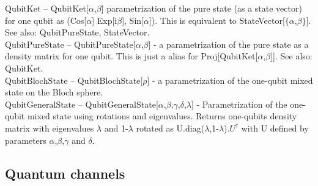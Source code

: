 \noindent\textbf{$ \text{QubitKet} $ }-- QubitKet[$\alpha $,$\beta $] parametrization of the pure state (as a state vector) for one qubit as (Cos[$\alpha $] Exp[i$\beta $], Sin[$\alpha $]). This is equivalent to StateVector[$\{\alpha $,$\beta \}$]. See also: QubitPureState, StateVector.$  $\\
\noindent\textbf{$ \text{QubitPureState} $ }-- QubitPureState[$\alpha $,$\beta $] - a parametrization of the pure state as a density matrix for one qubit. This is just a alias for Proj[QubitKet[$\alpha $,$\beta $]]. See also: QubitKet.$  $\\
\noindent\textbf{$ \text{QubitBlochState} $ }-- QubitBlochState[$\rho $] - a parametrization of the one-qubit mixed state on the Bloch sphere.$  $\\
\noindent\textbf{$ \text{QubitGeneralState} $ }-- QubitGeneralState[$\alpha $,$\beta $,$\gamma $,$\delta $,$\lambda $] - Parametrization of the one-qubit mixed state using rotations and eigenvalues. Returns one-qubits density matrix with eigenvalues $\lambda $ and 1-$\lambda $ rotated as U.diag($\lambda $,1-$\lambda $).$ U^{\dagger } $ with U defined by parameters $\alpha $,$\beta $,$\gamma $ and $\delta $.$  $\\
\subsection{Quantum channels}

